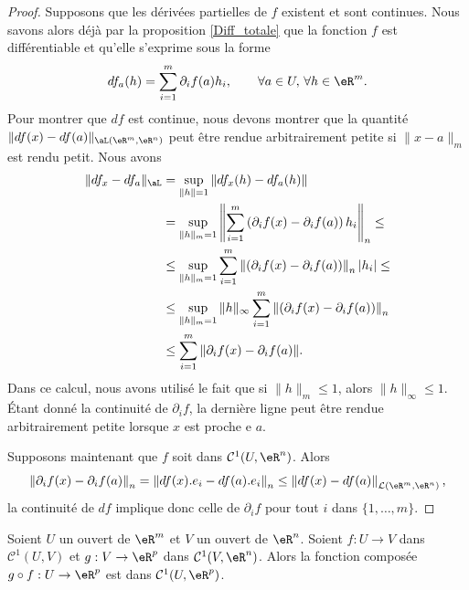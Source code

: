 \begin{proof}
	Supposons que les dérivées partielles de $f$ existent et sont continues. Nous savons alors déjà par la proposition \ref{Diff_totale} que la fonction $f$ est différentiable et qu'elle s'exprime sous la forme
	\[
		df_a(h)=\sum_{i=1}^{m}\partial_if (a)h_i, \qquad \forall a \in U,\,\forall h\in\eR^m.
	\]
	Pour montrer que $df$ est continue, nous devons montrer que la quantité $\| df(x)-df(a) \|_{\aL(\eR^m,\eR^n)}$ peut être rendue arbitrairement petite si $\| x-a \|_m$ est rendu petit. Nous avons
	\begin{equation}
		\begin{aligned}
			\| df_x-df_a \|_{\aL}&=\sup_{\| h \|=1}\| df_x(h)-df_a(h) \|\\
			&=\sup_{\| h \|_m=1}\left\|\sum_{i=1}^{m}\left(\partial_if (x)-\partial_if (a)\right)h_i\right\|_n\leq\\
			&\leq\sup_{\| h \|_m=1}\sum_{i=1}^{m} \left\|\left(\partial_if (x)-\partial_if (a)\right)\right\|_n|h_i|\leq\\
			&\leq\sup_{\| h \|_m=1} \|h\|_\infty\sum_{i=1}^{m} \left\|\left(\partial_if (x)-\partial_if (a)\right)\right\|_n\\
			&\leq \sum_{i=1}^m\| \partial_if(x)-\partial_if(a) \|.
		\end{aligned}
	\end{equation}
	Dans ce calcul, nous avons utilisé le fait que si $\| h \|_m\leq 1$, alors $\| h \|_{\infty}\leq 1$. Étant donné la continuité de $\partial_if$, la dernière ligne peut être rendue arbitrairement petite lorsque $x$ est proche e $a$.

Supposons maintenant que $f$ soit dans $\mathcal{C}^1(U,\eR^n)$. Alors 
\[
\left\|\partial_if (x)-\partial_if (a)\right\|_n= \left\|df(x).e_i-df(a).e_i\right\|_n \leq  \left\|df(x)-df(a)\right\|_{\mathcal{L}(\eR^m,\eR^n)},
\]  
la continuité de $df$ implique donc celle de $\partial_i f$ pour tout $i$ dans $\{1,\ldots,m\}$.
\end{proof}
\begin{proposition}
  Soient $U$ un ouvert de $\eR^m$ et $V$ un ouvert de $\eR^n$. Soient $f: U\to V$  dans $\mathcal{C}^1(U,V)$ et $g: V \to \eR^p$ dans $\mathcal{C}^1(V,\eR^n)$.  Alors la fonction composée $g\circ f: U\to \eR^p $ est dans $\mathcal{C}^1(U,\eR^p)$.
\end{proposition}

